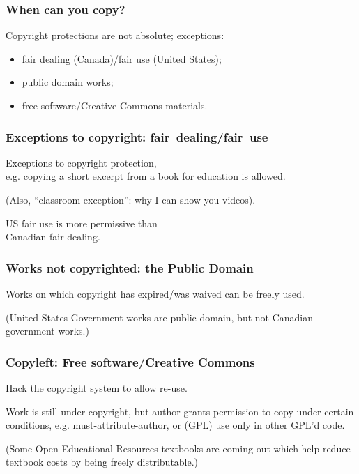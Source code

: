 \begin{frame}
\frametitle{When can you copy?}

\begin{changemargin}{1cm}
\Large
Copyright protections are not absolute; exceptions:
\vspace*{-1em}
\begin{itemize}
\item fair dealing (Canada)/fair use (United States);
\item public domain works;
\item free software/Creative Commons materials.
\end{itemize}
\end{changemargin}
\end{frame}

\begin{frame}
\frametitle{Exceptions to copyright: fair~dealing/fair~use}

\Large
\begin{changemargin}{1cm}
Exceptions to copyright protection, \\
e.g. copying a short excerpt from a book for education is allowed.

(Also, ``classroom exception'': why I can show you videos).

US fair use is more permissive than \\
Canadian fair dealing.

\end{changemargin}
\end{frame}

\begin{frame}
\frametitle{Works not copyrighted: the Public Domain}

\Large
\begin{changemargin}{1cm}
Works on which copyright has expired/was waived can be freely used.

(United States Government works are public domain, but not Canadian government works.)

\end{changemargin}
\end{frame}

\begin{frame}
\frametitle{Copyleft: Free software/Creative Commons}

\Large
\begin{changemargin}{1cm}
Hack the copyright system to allow re-use.

Work is still under copyright, but author grants permission to copy under certain conditions, e.g. must-attribute-author, or (GPL) use only in other GPL'd code.

(Some Open Educational Resources textbooks are coming out which help reduce textbook costs by being freely distributable.)
\end{changemargin}
\end{frame}

